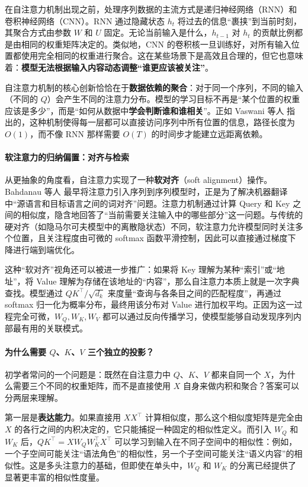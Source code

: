 在自注意力机制出现之前，处理序列数据的主流方式是递归神经网络（RNN）和卷积神经网络（CNN）。RNN 通过隐藏状态 $h_t$ 将过去的信息“裹挟”到当前时刻，其聚合方式由参数 $W$ 和 $U$ 固定。无论当前输入是什么，$h_{t-1}$ 对 $h_t$ 的贡献比例都是由相同的权重矩阵决定的。类似地，CNN 的卷积核一旦训练好，对所有输入位置都使用完全相同的权重进行聚合。这在某些场景下是高效且合理的，但它也意味着：\textbf{模型无法根据输入内容动态调整“谁更应该被关注”}。

自注意力机制的核心创新恰恰在于\textbf{数据依赖的聚合}：对于同一个序列，不同的输入（不同的 $Q$）会产生不同的注意力分布。模型的学习目标不再是“某个位置的权重应该是多少”，而是“如何从数据中\textbf{学会判断谁和谁相关}”。正如 Vaswani 等人\cite{vaswani2023attentionneed} 指出的，这种机制使得每一层都可以直接访问序列中所有位置的信息，路径长度为 $O(1)$，而不像 RNN 那样需要 $O(T)$ 的时间步才能建立远距离依赖。

\paragraph{软注意力的归纳偏置：对齐与检索}

从更抽象的角度看，自注意力实现了一种\textbf{软对齐}（soft alignment）操作。Bahdanau 等人\cite{bahdanau2016neuralmachinetranslationjointly} 最早将注意力引入序列到序列模型时，正是为了解决机器翻译中“源语言和目标语言之间的词对齐”问题。注意力机制通过计算 Query 和 Key 之间的相似度，隐含地回答了“当前需要关注输入中的哪些部分”这一问题。与传统的硬对齐（如隐马尔可夫模型中的离散隐状态）不同，软注意力允许模型同时关注多个位置，且关注程度由可微的 softmax 函数平滑控制，因此可以直接通过梯度下降进行端到端优化。

这种“软对齐”视角还可以被进一步推广：如果将 Key 理解为某种“索引”或“地址”，将 Value 理解为存储在该地址的“内容”，那么自注意力本质上就是一次字典查找。模型通过 $QK^\top/\sqrt{d_k}$ 来度量“查询与各条目之间的匹配程度”，再通过 softmax 归一化为概率分布，最终用该分布对 Value 进行加权平均。正因为这一过程完全可微，$W_Q, W_K, W_V$ 都可以通过反向传播学习，使模型能够自动发现序列内部最有用的关联模式。

\paragraph{为什么需要 $Q$、$K$、$V$ 三个独立的投影？}

初学者常问的一个问题是：既然在自注意力中 $Q$、$K$、$V$ 都来自同一个 $X$，为什么需要三个不同的权重矩阵，而不是直接使用 $X$ 自身来做内积和聚合？答案可以分两层来理解。

第一层是\textbf{表达能力}。如果直接用 $XX^\top$ 计算相似度，那么这个相似度矩阵是完全由 $X$ 的各行之间的内积决定的，它只能捕捉一种固定的相似性定义。而引入 $W_Q$ 和 $W_K$ 后，$QK^\top = XW_Q W_K^\top X^\top$ 可以学习到输入在不同子空间中的相似性：例如，一个子空间可能关注“语法角色”的相似性，另一个子空间可能关注“语义内容”的相似性。这是多头注意力的基础，但即使在单头中，$W_Q$ 和 $W_K$ 的分离已经提供了显著更丰富的相似性度量。

